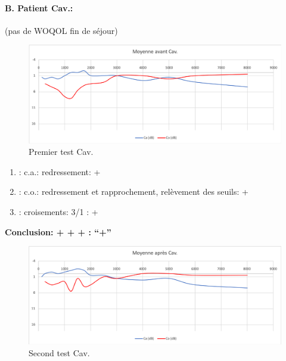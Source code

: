 \paragraph{B. Patient Cav.: }

(pas de WOQOL fin de séjour)


\begin{figure}[th]
\centering
\includegraphics[width=1\linewidth]{images/graphiques/cav_pre.png}
\caption[Moyenne OG+OD]{Premier test Cav.}

\end{figure}

	\begin{enumerate}

 		\item : c.a.: redressement: +

 		\item : c.o.: redressement et rapprochement, relèvement des seuils: +
 		\item : croisements: 3/1 :  +

                \end{enumerate}

                \textbf{  Conclusion:  + + +       : ``+''}

                \begin{figure}
\centering
\includegraphics[width=1\linewidth]{images/graphiques/cav_post.png}
\caption[Moyenne OG+OD]{Second test Cav.}

                \end{figure}




